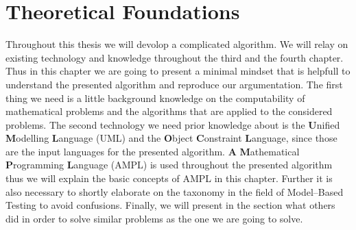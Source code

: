 \chapter{Theoretical Foundations}
Throughout this thesis we will devolop a complicated algorithm. We will relay on existing technology and knowledge throughout the third and the fourth chapter. Thus in this chapter we are going to present a minimal mindset that is helpfull to understand the presented algorithm and reproduce our argumentation. The first thing we need is a little background knowledge on the computability of mathematical problems and the algorithms that are applied to the considered problems. The second technology we need prior knowledge about is the \textbf{U}nified \textbf{M}odelling \textbf{L}anguage (UML) and the \textbf{O}bject \textbf{C}onstraint \textbf{L}anguage, since those are the input languages for the presented algorithm. \textbf{A} \textbf{M}athematical \textbf{P}rogramming \textbf{L}anguage (AMPL) is used throughout the presented algorithm thus we will explain the basic concepts of AMPL in this chapter. Further it is also necessary to shortly elaborate on the taxonomy in the field of Model--Based Testing to avoid confusions. Finally, we will present in the section  what others did in order to solve similar problems as the one we are going to solve.
\label{chap:preliminaries}
